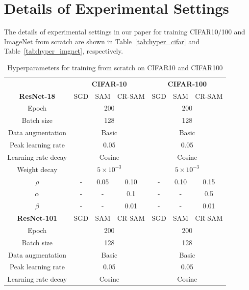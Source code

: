 \documentclass[letterpaper]{article} %
\theoremstyle{plain}
\theoremstyle{definition}
\newcommand{\tref}[1]{Table~\ref{#1}}
\begin{document}
\section{Details of Experimental Settings}

The details of experimental settings in our paper for training CIFAR10/100 and ImageNet from scratch are shown in \tref{tab:hyper_cifar} and \tref{tab:hyper_imgnet}, respectively.


\begin{table}[h!]
\caption{\footnotesize Hyperparameters for training from scratch on CIFAR10 and CIFAR100}
  \centering
  \small
  \begin{tabular}{c|ccc|ccc}
  \toprule
     & \multicolumn{3}{c|}{\textbf{CIFAR-10 }} & \multicolumn{3}{c}{ \textbf{CIFAR-100}} \\
   \textbf{ResNet-18 }  & SGD & SAM &CR-SAM& SGD & SAM &CR-SAM\\
   \midrule
   Epoch&\multicolumn{3}{c|}{200}&\multicolumn{3}{c}{200}\\
   Batch size&\multicolumn{3}{c|}{128}&\multicolumn{3}{c}{128}\\
   Data augmentation &\multicolumn{3}{c|}{Basic}&\multicolumn{3}{c}{Basic}\\
   Peak learning rate &\multicolumn{3}{c|}{0.05}&\multicolumn{3}{c}{0.05}\\
   Learning rate decay &\multicolumn{3}{c|}{Cosine}&\multicolumn{3}{c}{Cosine}\\
   Weight decay &\multicolumn{3}{c|}{$5\times10^{-3}$}&\multicolumn{3}{c}{$5\times10^{-3}$}\\
   $\rho$ & -&0.05&0.10&-&0.10&0.15\\
   $\alpha$ &-&-&0.1&-&-&0.5\\
   $\beta$ &-&-&0.01&-&-&0.01\\
    \midrule
         \textbf{ResNet-101 }  & SGD & SAM &CR-SAM& SGD & SAM &CR-SAM\\
   \midrule
   Epoch&\multicolumn{3}{c|}{200}&\multicolumn{3}{c}{200}\\
   Batch size&\multicolumn{3}{c|}{128}&\multicolumn{3}{c}{128}\\
   Data augmentation &\multicolumn{3}{c|}{Basic}&\multicolumn{3}{c}{Basic}\\
   Peak learning rate &\multicolumn{3}{c|}{0.05}&\multicolumn{3}{c}{0.05}\\
   Learning rate decay &\multicolumn{3}{c|}{Cosine}&\multicolumn{3}{c}{Cosine}\\

\end{tabular}
\end{table}
\end{document}
